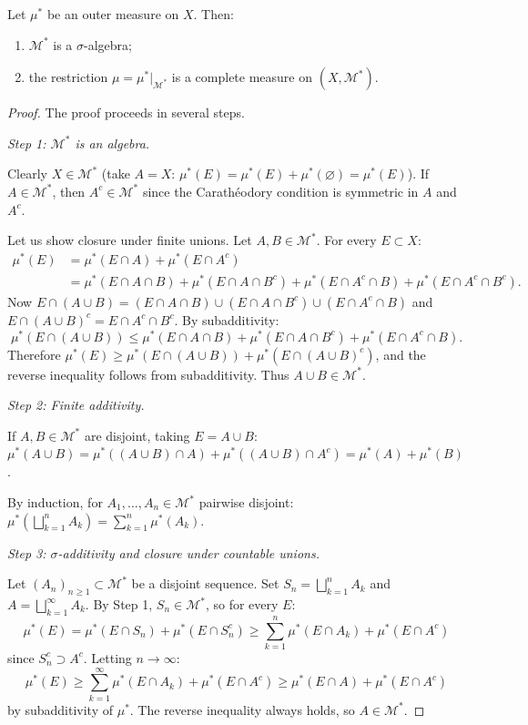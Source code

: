 \begin{theorem}
\label{thm:caratheodory}
Let $\mu^*$ be an outer measure on $X$. Then:
\begin{enumerate}
    \item $\mathcal{M}^*$ is a $\sigma$-algebra;
    \item the restriction $\mu = \mu^*|_{\mathcal{M}^*}$ is a complete measure on
    $(X, \mathcal{M}^*)$.
\end{enumerate}
\end{theorem}

\begin{proof}
The proof proceeds in several steps.

\emph{Step 1: $\mathcal{M}^*$ is an algebra.}

Clearly $X \in \mathcal{M}^*$ (take $A = X$: $\mu^*(E) = \mu^*(E) +
\mu^*(\varnothing) = \mu^*(E)$). If $A \in \mathcal{M}^*$, then $A^c \in
\mathcal{M}^*$ since the Carath\'eodory condition is symmetric in $A$ and $A^c$.

Let us show closure under finite unions. Let $A, B \in \mathcal{M}^*$. For every
$E \subset X$:
\begin{align*}
\mu^*(E) &= \mu^*(E \cap A) + \mu^*(E \cap A^c) \\
&= \mu^*(E \cap A \cap B) + \mu^*(E \cap A \cap B^c) + \mu^*(E \cap A^c \cap B)
+ \mu^*(E \cap A^c \cap B^c).
\end{align*}
Now $E \cap (A \cup B) = (E \cap A \cap B) \cup (E \cap A \cap B^c) \cup
(E \cap A^c \cap B)$ and $E \cap (A \cup B)^c = E \cap A^c \cap B^c$. By
subadditivity:
\[
\mu^*(E \cap (A \cup B)) \leq \mu^*(E \cap A \cap B) + \mu^*(E \cap A \cap B^c)
+ \mu^*(E \cap A^c \cap B).
\]
Therefore $\mu^*(E) \geq \mu^*(E \cap (A \cup B)) + \mu^*(E \cap (A \cup B)^c)$,
and the reverse inequality follows from subadditivity. Thus $A \cup B \in
\mathcal{M}^*$.

\emph{Step 2: Finite additivity.}

If $A, B \in \mathcal{M}^*$ are disjoint, taking $E = A \cup B$:
$\mu^*(A \cup B) = \mu^*((A \cup B) \cap A) + \mu^*((A \cup B) \cap A^c)
= \mu^*(A) + \mu^*(B)$.

By induction, for $A_1, \ldots, A_n \in \mathcal{M}^*$ pairwise disjoint:
$\mu^*\!\left(\bigsqcup_{k=1}^n A_k\right) = \sum_{k=1}^n \mu^*(A_k)$.

\emph{Step 3: $\sigma$-additivity and closure under countable unions.}

Let $(A_n)_{n \geq 1} \subset \mathcal{M}^*$ be a disjoint sequence. Set
$S_n = \bigsqcup_{k=1}^n A_k$ and $A = \bigsqcup_{k=1}^\infty A_k$. By Step 1,
$S_n \in \mathcal{M}^*$, so for every $E$:
\[
\mu^*(E) = \mu^*(E \cap S_n) + \mu^*(E \cap S_n^c)
\geq \sum_{k=1}^n \mu^*(E \cap A_k) + \mu^*(E \cap A^c)
\]
since $S_n^c \supset A^c$. Letting $n \to \infty$:
\[
\mu^*(E) \geq \sum_{k=1}^{\infty} \mu^*(E \cap A_k) + \mu^*(E \cap A^c)
\geq \mu^*(E \cap A) + \mu^*(E \cap A^c)
\]
by subadditivity of $\mu^*$. The reverse inequality always holds, so
$A \in \mathcal{M}^*$.


\end{proof}
